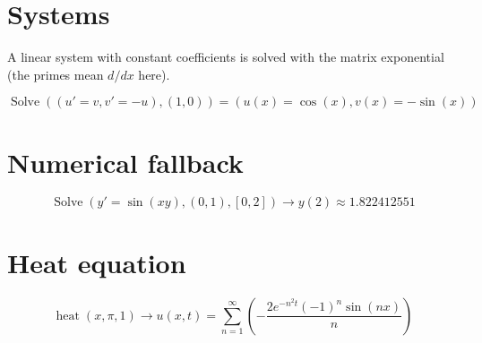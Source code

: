 \documentclass[11pt,a4paper]{article}
\theoremstyle{plain}
\theoremstyle{definition}
\theoremstyle{remark}
\begin{document}
\section*{Systems}

A linear system with constant coefficients is solved with the matrix exponential (the primes mean $d/dx$ here).

\begin{equation*}
  \operatorname{Solve}((u' = v, v' = -u), (1, 0)) = \left(u\left(x\right) = \cos\left(x\right), v\left(x\right) = -\sin\left(x\right)\right)
\end{equation*}
\section*{Numerical fallback}

\begin{equation*}
  \operatorname{Solve}(y' = \sin(x y), (0, 1), [0, 2]) \to y\left(2\right) \approx 1.822412551
\end{equation*}
\section*{Heat equation}

\begin{equation*}
  \operatorname{heat}(x, \pi, 1) \to u\left(x, t\right) = \sum_{n=1}^{\infty} \left(-\frac{2 e^{-n^{2} t} \left(-1\right)^{n} \sin\left(n x\right)}{n}\right)
\end{equation*}
\end{document}
